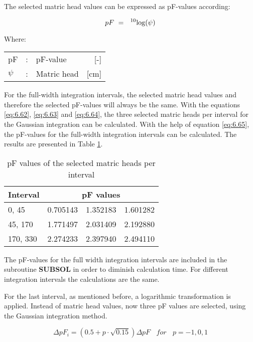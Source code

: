 The selected matric head values can be expressed as pF-values according:

\begin{equation}
\label{eq:6.65}
pF ~=~\ ^{10} {\rm log} (\psi )
\end{equation}

Where:\\[5pt]
\begin{tabularx}{\textwidth}{llXr}
pF &:& pF-value  & [-]\\
$\psi$ &:& Matric head  & [cm]\\
\end{tabularx}

For the full-width integration intervals, the selected matric head values and therefore the
selected pF-values will always be the same. With the equations \ref{eq:6.62},  
\ref{eq:6.63} and \ref{eq:6.64}, the
three selected matric heads per interval for the Gaussian integration can be calculated.
With the help of equation \ref{eq:6.65}, the pF-values for the full-width integration intervals can
be calculated. The results are presented in Table \ref{tab:Table6.3}.

\begin{table}
\centering
\caption{pF values of the selected matric heads per interval}
\label{tab:Table6.3}
\begin{tabular}{l|rrr}
\hline
Interval & \multicolumn{3}{c}{pF values}\\
\hline
0, 45    & 0.705143  &  1.352183 &    1.601282    \\
45, 170  &  1.771497 &  2.031409 &    2.192880    \\
170, 330 &  2.274233 &  2.397940 &    2.494110    \\
\hline
\end{tabular}
\end{table}

The pF-values for the full width integration intervals are included in the subroutine
{\bf SUBSOL} in order to diminish calculation time. For different integration intervals the
calculations are the same. 

For the last interval, as mentioned before, a logarithmic transformation is applied. Instead
of matric head values, now three pF values are selected, using the Gaussian integration
method.

\begin{equation}
\label{eq:6.66}
\Delta pF_{i} = (0.5 + p \cdot \sqrt{0.15})\Delta pF ~~~~ for ~~~~ p = -1, 0, 1
\end{equation}

